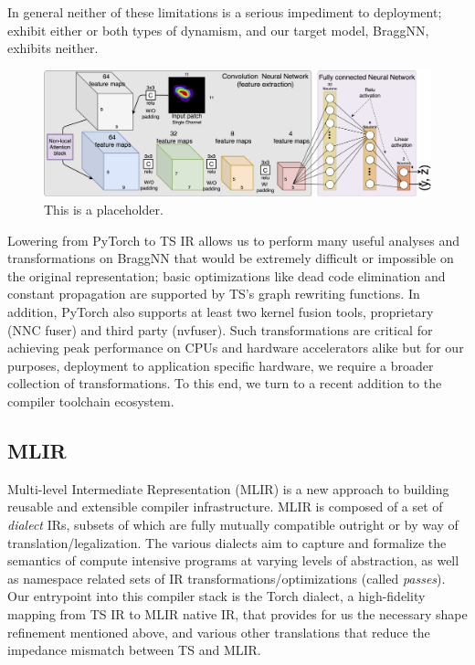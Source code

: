 In general neither of these limitations is a serious impediment to deployment;  exhibit either or both types of dynamism, and our target model, BraggNN, exhibits neither.
\begin{figure}
	\includegraphics[width=\textwidth]{figures/BraggNN}
	\caption{This is a placeholder.}
\end{figure}
Lowering from PyTorch to TS IR allows us to perform many useful analyses and transformations on BraggNN that would be extremely difficult or impossible on the original representation; basic optimizations like dead code elimination and constant propagation are supported by TS's graph rewriting functions.
In addition, PyTorch also supports at least two kernel fusion\cite{10.1145/2688500.2688521} tools, proprietary (NNC fuser) and third party (nvfuser).
Such transformations are critical for achieving peak performance on CPUs and hardware accelerators alike but for our purposes, deployment to application specific hardware, we require a broader collection of transformations.
To this end, we turn to a recent addition to the compiler toolchain ecosystem.

\subsection{MLIR}\label{subsec:mlir}

Multi-level Intermediate Representation\cite{https://doi.org/10.48550/arxiv.2002.11054} (MLIR) is a new approach to building reusable and extensible compiler infrastructure.
MLIR is composed of a set of \emph{dialect} IRs, subsets of which are fully mutually compatible outright or by way of translation/legalization.
The various dialects aim to capture and formalize the semantics of compute intensive programs at varying levels of abstraction, as well as namespace related sets of IR transformations/optimizations (called \emph{passes}).
Our entrypoint into this compiler stack is the Torch dialect\cite{torch-mlir}, a high-fidelity mapping from TS IR to MLIR native IR, that provides for us the necessary shape refinement mentioned above, and various other translations that reduce the impedance mismatch between TS and MLIR.

